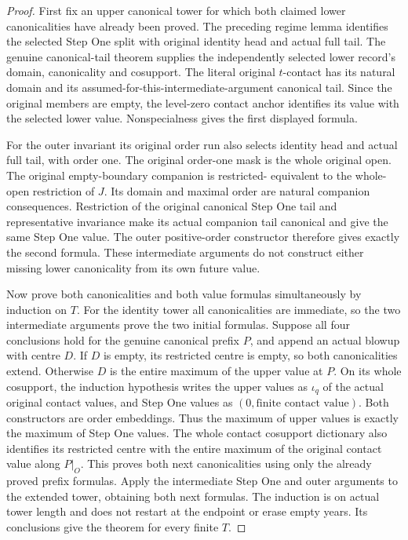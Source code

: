\begin{proof}
First fix an upper canonical tower for which both claimed lower canonicalities
have already been proved. The preceding regime lemma identifies the selected
Step One split with original identity head and actual full tail. The genuine
canonical-tail theorem supplies the independently selected lower record's
domain, canonicality and cosupport. The literal original $t$-contact has
its natural domain and its assumed-for-this-intermediate-argument canonical
tail. Since the original members are empty, the level-zero contact anchor
identifies its value with the selected lower value. Nonspecialness gives
the first displayed formula.

For the outer invariant its original order run also selects identity head
and actual full tail, with order one. The original order-one mask is the
whole original open. The original empty-boundary companion is restricted-
equivalent to the whole-open restriction of $J$. Its domain and maximal
order are natural companion consequences. Restriction of the original
canonical Step One tail and representative invariance make its actual
companion tail canonical and give the same Step One value. The outer
positive-order constructor therefore gives exactly the second formula.
These intermediate arguments do not construct either missing lower
canonicality from its own future value.

Now prove both canonicalities and both value formulas simultaneously by
induction on $T$. For the identity tower all canonicalities are immediate,
so the two intermediate arguments prove the two initial formulas. Suppose
all four conclusions hold for the genuine canonical prefix $P$, and append
an actual blowup with centre $D$. If $D$ is empty, its restricted centre is
empty, so both canonicalities extend. Otherwise $D$ is the entire maximum
of the upper value at $P$. On its whole cosupport, the induction hypothesis
writes the upper values as $\iota_q$ of the actual original contact values,
and Step One values as $(0,\text{finite contact value})$. Both constructors
are order embeddings. Thus the maximum of upper values is exactly the
maximum of Step One values. The whole contact cosupport dictionary also
identifies its restricted centre with the entire maximum of the original
contact value along $P|_O$. This proves both next canonicalities using only
the already proved prefix formulas. Apply the intermediate Step One and
outer arguments to the extended tower, obtaining both next formulas.
The induction is on actual tower length and does not restart at the endpoint
or erase empty years. Its conclusions give the theorem for every finite $T$.
\end{proof}

